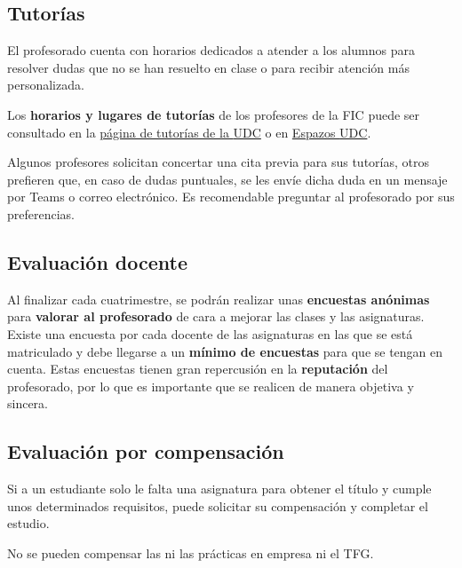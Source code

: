 \subsection{Tutorías} 

El profesorado cuenta con horarios dedicados a atender a los alumnos para resolver dudas que no se han resuelto en clase o para recibir atención más personalizada.  

Los \textbf{horarios y lugares de tutorías} de los profesores de la \acrshort{FIC} puede ser consultado en la \href{https://www.udc.es/es/centros_departamentos_servizos/centros/titorias/?codigo=614}{página de tutorías de la \acrshort{UDC}} o en \href{https://espazos.udc.es/centers/614/tutorials}{Espazos \acrshort{UDC}}.

\begin{infoBox}
    Algunos profesores solicitan concertar una cita previa para sus tutorías, otros prefieren que, en caso de dudas puntuales, se les envíe dicha duda en un mensaje por Teams o correo electrónico. Es recomendable preguntar al profesorado por sus preferencias.     
\end{infoBox}
 
\subsection{Evaluación docente}

Al finalizar cada cuatrimestre, se podrán realizar unas \textbf{encuestas anónimas} para \textbf{valorar al profesorado} de cara a mejorar las clases y las asignaturas. Existe una encuesta por cada docente de las asignaturas en las que se está matriculado y debe llegarse a un \textbf{mínimo de encuestas} para que se tengan en cuenta. Estas encuestas tienen gran repercusión en la \textbf{reputación} del profesorado, por lo que es importante que se realicen de manera objetiva y sincera. 

\subsection{Evaluación por compensación}

Si a un estudiante solo le falta una asignatura para obtener el título y cumple unos determinados requisitos, puede solicitar su compensación y completar el estudio.

\begin{infoBox}
    No se pueden compensar las ni las prácticas en empresa ni el \acrshort{TFG}.
\end{infoBox}
